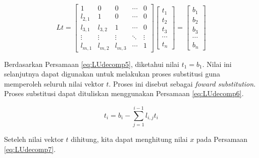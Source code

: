 \documentclass[]{book}
\theoremstyle{definition}
\theoremstyle{definition}
\theoremstyle{definition}
\theoremstyle{remark}
\begin{document}
\begin{equation}
Lt=
\begin{bmatrix}
     1       & 0       & 0 &\cdots& 0           \\[0.3em]
     l_{2,1} & 1       & 0 &\cdots& 0           \\[0.3em]
     l_{3,1} & l_{3,2} & 1 &\cdots& 0           \\[0.3em]
     \vdots  & \vdots  & \vdots  &\ddots& \vdots            \\[0.3em]
     l_{m,1} & l_{m,2} & l_{m,3} &\cdots& 1
     \end{bmatrix}
\begin{bmatrix}
     t_1                                          \\[0.3em]
     t_2                                          \\[0.3em]
     t_3                                          \\[0.3em]
     \cdots                                       \\[0.3em]
     t_n                                       
     \end{bmatrix}
= \begin{bmatrix}
     b_1                                          \\[0.3em]
     b_2                                          \\[0.3em]
     b_3                                          \\[0.3em]
     \cdots                                       \\[0.3em]
     b_n                                       
     \end{bmatrix}
  \label{eq:LUdecomp5}
\end{equation}

Berdasarkan Persamaan \eqref{eq:LUdecomp5}, diketahui nilai \(t_1=b_1\). Nilai ini selanjutnya dapat digunakan untuk melakukan proses substitusi guna memperoleh seluruh nilai vektor \(t\). Proses ini disebut sebagai \emph{foward substitution}. Proses substitusi dapat dituliskan menggunakan Persamaan \eqref{eq:LUdecomp6}.

\begin{equation}
t_i=b_i-\sum_{j=1}^{i-1}l_{i,j}t_i
  \label{eq:LUdecomp6}
\end{equation}

Seteleh nilai vektor \(t\) dihitung, kita dapat menghitung nilai \(x\) pada Persamaan \eqref{eq:LUdecomp7}.
\end{document}
